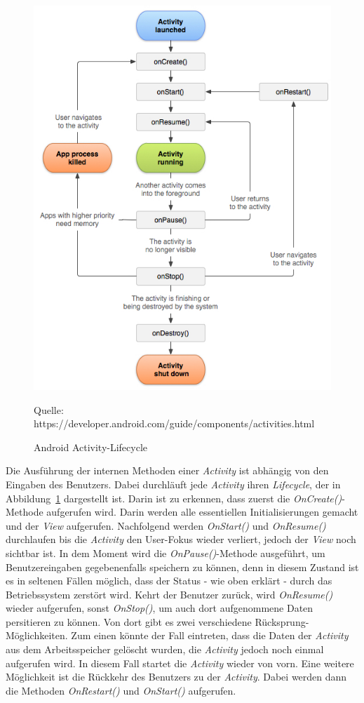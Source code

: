 \begin{figure}[h]
\centering
\includegraphics[width=0.8\linewidth]{content/images/Android-ActivityLifecycle}
\caption{Android Activity-Lifecycle}
Quelle: https://developer.android.com/guide/components/activities.html
\label{pic:androidActivityLifecycle}
\end{figure}
Die Ausführung der internen Methoden einer \textit{Activity} ist abhängig von den Eingaben des Benutzers. Dabei durchläuft jede \textit{Activity} ihren \textit{Lifecycle}, der in Abbildung~\ref{pic:androidActivityLifecycle} dargestellt ist. Darin ist zu erkennen, dass zuerst die \textit{OnCreate()}-Methode aufgerufen wird. Darin werden alle essentiellen Initialisierungen gemacht und der \textit{View} aufgerufen. Nachfolgend werden \textit{OnStart()} und \textit{OnResume()} durchlaufen bis die \textit{Activity} den User-Fokus wieder verliert, jedoch der \textit{View} noch sichtbar ist. In dem Moment wird die \textit{OnPause()}-Methode ausgeführt, um Benutzereingaben gegebenenfalls speichern zu können, denn in diesem Zustand ist es in seltenen Fällen möglich, dass der Status - wie oben erklärt - durch das Betriebssystem zerstört wird. Kehrt der Benutzer zurück, wird \textit{OnResume()} wieder aufgerufen, sonst \textit{OnStop()}, um auch dort aufgenommene Daten persitieren zu können. Von dort gibt es zwei verschiedene Rücksprung-Möglichkeiten. Zum einen könnte der Fall eintreten, dass die Daten der \textit{Activity} aus dem Arbeitsspeicher gelöscht wurden, die \textit{Activity} jedoch noch einmal aufgerufen wird. In diesem Fall startet die \textit{Activity} wieder von vorn. Eine weitere Möglichkeit ist die Rückkehr des Benutzers zu der \textit{Activity}. Dabei werden dann die Methoden \textit{OnRestart()} und \textit{OnStart()} aufgerufen.\\
